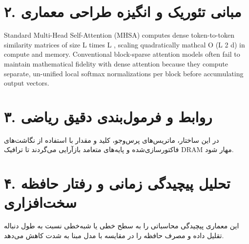 \documentclass[12pt,a4paper]{article}
\begin{document}
\section*{۲. مبانی تئوریک و انگیزه طراحی معماری}
Standard Multi-Head Self-Attention (MHSA) computes dense token-to-token similarity matrices of size L times L , scaling quadratically mathcal O (L 2 d) in compute and memory. Conventional block-sparse attention models often fail to maintain mathematical fidelity with dense attention because they compute separate, un-unified local softmax normalizations per block before accumulating output vectors.

\section*{۳. روابط و فرمول‌بندی دقیق ریاضی}
در این ساختار، ماتریس‌های پرس‌وجو، کلید و مقدار با استفاده از نگاشت‌های فاکتورسازی‌شده و پایه‌های متعامد بازآرایی می‌گردند تا ترافیک DRAM مهار شود.

\section*{۴. تحلیل پیچیدگی زمانی و رفتار حافظه سخت‌افزاری}
این معماری پیچیدگی محاسباتی را به سطح خطی یا شبه‌خطی نسبت به طول دنباله تقلیل داده و مصرف حافظه را در مقایسه با مدل مبنا به شدت کاهش می‌دهد.
\end{document}
